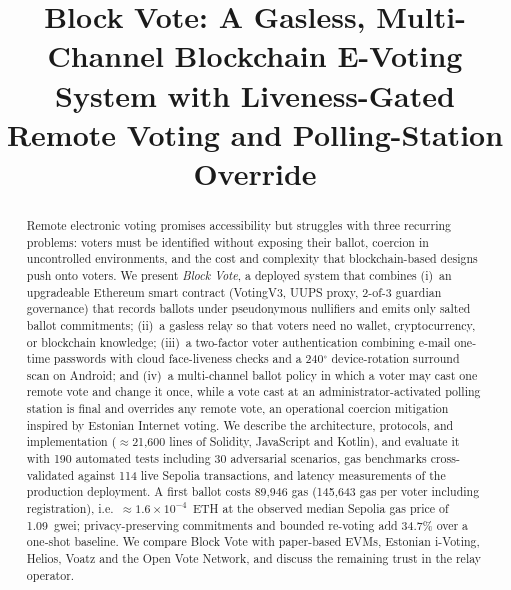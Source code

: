 \documentclass[conference]{IEEEtran}
\begin{document}
\title{Block Vote: A Gasless, Multi-Channel Blockchain E-Voting System with Liveness-Gated Remote Voting and Polling-Station Override}

\author{
}

\maketitle

\begin{abstract}
Remote electronic voting promises accessibility but struggles with three recurring problems: voters must be identified without exposing their ballot, coercion in uncontrolled environments, and the cost and complexity that blockchain-based designs push onto voters. We present \emph{Block Vote}, a deployed system that combines (i)~an upgradeable Ethereum smart contract (VotingV3, UUPS proxy, 2-of-3 guardian governance) that records ballots under pseudonymous nullifiers and emits only salted ballot commitments; (ii)~a gasless relay so that voters need no wallet, cryptocurrency, or blockchain knowledge; (iii)~a two-factor voter authentication combining e-mail one-time passwords with cloud face-liveness checks and a 240$^\circ$ device-rotation surround scan on Android; and (iv)~a multi-channel ballot policy in which a voter may cast one remote vote and change it once, while a vote cast at an administrator-activated polling station is final and overrides any remote vote, an operational coercion mitigation inspired by Estonian Internet voting. We describe the architecture, protocols, and implementation (\mbox{$\approx$21,600} lines of Solidity, JavaScript and Kotlin), and evaluate it with 190 automated tests including 30 adversarial scenarios, gas benchmarks cross-validated against 114 live Sepolia transactions, and latency measurements of the production deployment. A first ballot costs 89,946 gas (145,643 gas per voter including registration), i.e.\ $\approx 1.6\times10^{-4}$~ETH at the observed median Sepolia gas price of 1.09~gwei; privacy-preserving commitments and bounded re-voting add 34.7\% over a one-shot baseline. We compare Block Vote with paper-based EVMs, Estonian i-Voting, Helios, Voatz and the Open Vote Network, and discuss the remaining trust in the relay operator.
\end{abstract}
\end{document}
